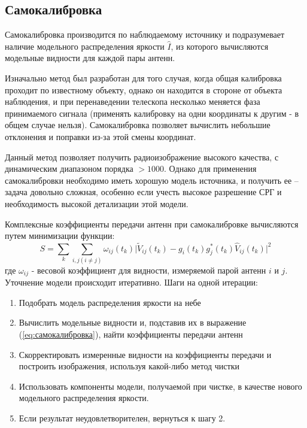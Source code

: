 \subsection{Самокалибровка}
Самокалибровка производится по наблюдаемому источнику и подразумевает наличие модельного распределения яркости $\hat{I}$, из которого вычисляются модельные видности для каждой пары антенн.

Изначально метод был разработан для того случая, когда общая калибровка проходит по известному объекту, однако он находится в стороне от объекта наблюдения, и при перенаведении телескопа несколько меняется фаза принимаемого сигнала (применять калибровку на одни координаты к другим - в общем случае нельзя). Самокалибровка позволяет вычислить небольшие отклонения и поправки из-за этой смены координат.

Данный метод позволяет получить радиоизображение высокого качества, с динамическим диапазоном порядка $>1000$. Однако для применения самокалибровки необходимо иметь хорошую модель источника, и получить ее -- задача довольно сложная, особенно если учесть высокое разрешение СРГ и необходимость высокой детализации этой модели.

Комплексные коэффициенты передачи антенн при самокалибровке вычисляются путем минимизации функции:
\begin{equation}\label{eq:самокалибровка}
	S = \sum_{k}^{} \sum_{i,j (i \not= j)}^{} \omega_{ij}(t_{k}) \lvert \widetilde{V}_{ij}(t_k) -  g_i(t_k)g_j^*(t_k)\hat{V}_{ij}(t_k) \rvert^2
\end{equation}
где $ \omega_{ij}$ - весовой коэффициент для видности, измеряемой парой антенн $i$ и $j$.\\

Уточнение модели происходит итеративно. Шаги на одной итерации:
\begin{enumerate}
	\item Подобрать модель распределения яркости на небе
	\item Вычислить модельные видности и, подставив их в выражение (\ref{eq:самокалибровка}), найти коэффициенты передачи антенн
	\item Скорректировать измеренные видности на коэффициенты передачи и построить изображения, используя какой-либо метод чистки
	\item Использовать компоненты модели, получаемой при чистке, в качестве нового модельного распределения яркости.
	\item Если результат неудовлетворителен, вернуться к шагу 2.
\end{enumerate}

